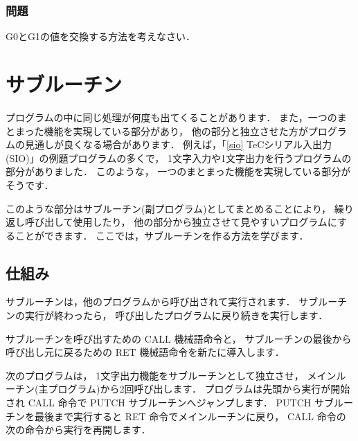 \subsubsection{問題}

G0とG1の値を交換する方法を考えなさい．

\section{サブルーチン}

プログラムの中に同じ処理が何度も出てくることがあります．
また，一つのまとまった機能を実現している部分があり，
他の部分と独立させた方がプログラムの見通しが良くなる場合があります．
例えば，「\ref{sio} TeCシリアル入出力(SIO)」の例題プログラムの多くで，
1文字入力や1文字出力を行うプログラムの部分がありました．
このような，
一つのまとまった機能を実現している部分がそうです．

このような部分はサブルーチン(副プログラム)としてまとめることにより，
繰り返し呼び出して使用したり，
他の部分から独立させて見やすいプログラムにすることができます．
ここでは，サブルーチンを作る方法を学びます．

\subsection{仕組み}

サブルーチンは，他のプログラムから呼び出されて実行されます．
サブルーチンの実行が終わったら，
呼び出したプログラムに戻り続きを実行します．

サブルーチンを呼び出すための CALL 機械語命令と，
サブルーチンの最後から呼び出し元に戻るための RET 機械語命令を新たに導入します．

次のプログラムは，
1文字出力機能をサブルーチンとして独立させ，
メインルーチン(主プログラム)から2回呼び出します．
プログラムは先頭から実行が開始され
CALL 命令で PUTCH サブルーチンへジャンプします．
PUTCH サブルーチンを最後まで実行すると
RET 命令でメインルーチンに戻り，
CALL 命令の次の命令から実行を再開します．

\begin{center}
\epsfxsize=5.3cm
\end{center}

